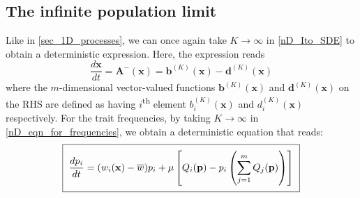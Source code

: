 \subsection{The infinite population limit}\label{sec_nD_det_limit}
Like in \ref{sec_1D_processes}, we can once again take $K \to \infty$ in \eqref{nD_Ito_SDE} to obtain a deterministic expression. Here, the expression reads
\begin{equation}
\label{nD_det_limit}
\frac{d\mathbf{x}}{dt} = \mathbf{A^-}(\mathbf{x}) = \mathbf{b}^{(K)}(\mathbf{x}) - \mathbf{d}^{(K)}(\mathbf{x})
\end{equation}
where the $m$-dimensional vector-valued functions $\mathbf{b}^{(K)}(\mathbf{x})$ and $\mathbf{d}^{(K)}(\mathbf{x})$ on the RHS are defined as having $i$\textsuperscript{th} element $b^{(K)}_i(\mathbf{x})$ and $d^{(K)}_i(\mathbf{x})$ respectively. For the trait frequencies, by taking $K \to \infty$ in \eqref{nD_eqn_for_frequencies}, we obtain a deterministic equation that reads:
\begin{equation}
\label{nD_replicator_mutator}
\setlength{\fboxsep}{2\fboxsep}\boxed{\frac{dp_i}{dt} = (w_i(\mathbf{x}) - \overline{w})p_i + \mu\left[Q_i(\mathbf{p}) - p_i\left(\sum\limits_{j=1}^{m}Q_j(\mathbf{p})\right)\right]}
\end{equation}
